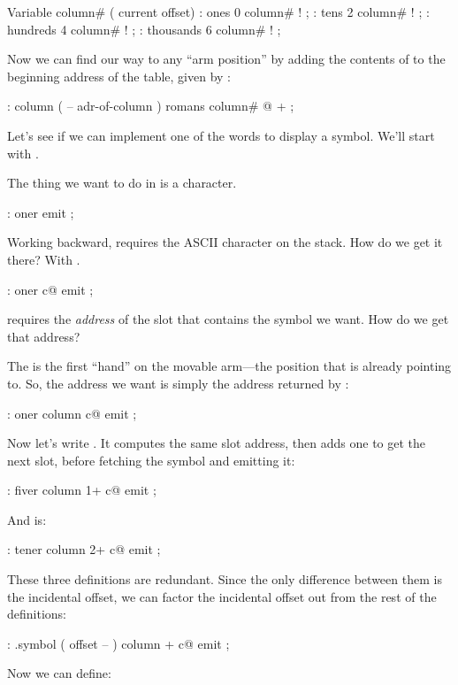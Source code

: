 \begin{Code}
Variable column#  ( current offset)
: ones        0 column# ! ;
: tens        2 column# ! ;
: hundreds    4 column# ! ;
: thousands   6 column# ! ;
\end{Code}
Now we can find our way to any ``arm position'' by adding the contents of
 to the beginning address of the table, given by
:

\begin{Code}
: column  ( -- adr-of-column )  romans  column# @  + ;
\end{Code}
Let's see if we can implement one of the words to display a symbol. We'll
start with .

The thing we want to do in  is  a character.

\begin{Code}
: oner                   emit ;
\end{Code}
Working backward,  requires the ASCII character on the stack.
How do we get it there? With .

\begin{Code}
: oner                c@ emit ;
\end{Code}
 requires the \emph{address} of the slot that contains the
symbol we want. How do we get that address?

The  is the first ``hand'' on the movable arm---the position
that  is already pointing to. So, the address we want is
simply the address returned by :

\begin{Code}
: oner   column       c@ emit ;
\end{Code}
Now let's write . It computes the same slot address, then
adds one to get the next slot, before fetching the symbol and emitting it:

\begin{Code}
: fiver  column 1+    c@ emit ;
\end{Code}
And  is:

\begin{Code}
: tener  column 2+    c@ emit ;
\end{Code}
These three definitions are redundant. Since the only difference between
them is the incidental offset, we can factor the incidental offset out
from the rest of the definitions:

\begin{Code}
: .symbol  ( offset -- )  column +  c@ emit ;
\end{Code}
Now we can define:

